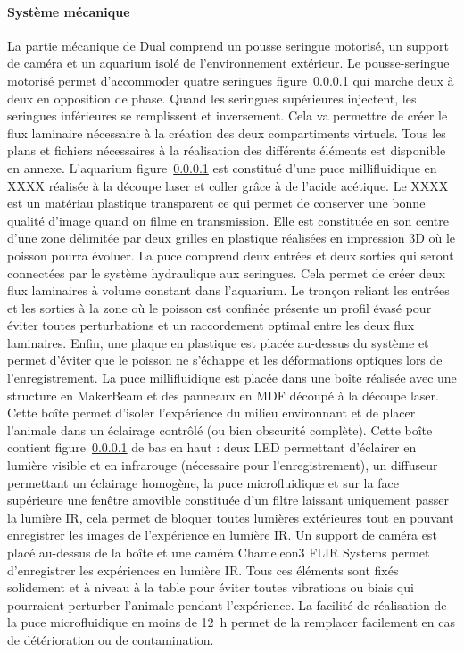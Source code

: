   \paragraph{Système mécanique}
  La partie mécanique de Dual comprend un pousse seringue motorisé, un support de caméra et un aquarium isolé de l'environnement extérieur. Le pousse-seringue motorisé permet d'accommoder quatre seringues figure~\ref{} qui marche deux à deux en opposition de phase. Quand les seringues supérieures injectent, les seringues inférieures se remplissent et inversement. Cela va permettre de créer le flux laminaire nécessaire à la création des deux compartiments virtuels. Tous les plans et fichiers nécessaires à la réalisation des différents éléments est disponible en annexe.
  \medbreak
  L'aquarium figure~\ref{} est constitué d'une puce millifluidique en XXXX réalisée à la découpe laser et coller grâce à de l'acide acétique. Le XXXX est un matériau plastique transparent ce qui permet de conserver une bonne qualité d'image quand on filme en transmission. Elle est constituée en son centre d'une zone délimitée par deux grilles en plastique réalisées en impression 3D où le poisson pourra évoluer. La puce comprend deux entrées et deux sorties qui seront connectées par le système hydraulique aux seringues. Cela permet de créer deux flux laminaires à volume constant dans l'aquarium. Le tronçon reliant les entrées et les sorties à la zone où le poisson est confinée présente un profil évasé pour éviter toutes perturbations et un raccordement optimal entre les deux flux laminaires. Enfin, une plaque en plastique est placée au-dessus du système et permet d'éviter que le poisson ne s'échappe et les déformations optiques lors de l'enregistrement.
  \medbreak
  La puce millifluidique est placée dans une boîte réalisée avec une structure en MakerBeam et des panneaux en MDF découpé à la découpe laser. Cette boîte permet d'isoler l'expérience du milieu environnant et de placer l'animale dans un éclairage contrôlé (ou bien obscurité complète). Cette boîte contient figure~\ref{} de bas en haut : deux LED permettant d'éclairer en lumière visible et en infrarouge (nécessaire pour l'enregistrement), un diffuseur permettant un éclairage homogène, la puce microfluidique et sur la face supérieure une fenêtre amovible constituée d'un filtre laissant uniquement passer la lumière IR, cela permet de bloquer toutes lumières extérieures tout en pouvant enregistrer les images de l'expérience en lumière IR.
  \medbreak
  Un support de caméra est placé au-dessus de la boîte et une caméra Chameleon3 FLIR Systems permet d'enregistrer les expériences en lumière IR.
  \medbreak
  Tous ces éléments sont fixés solidement et à niveau à la table pour éviter toutes vibrations ou biais qui pourraient perturber l'animale pendant l'expérience. La facilité de réalisation de la puce microfluidique en moins de 12 h permet de la remplacer facilement en cas de détérioration ou de contamination.

